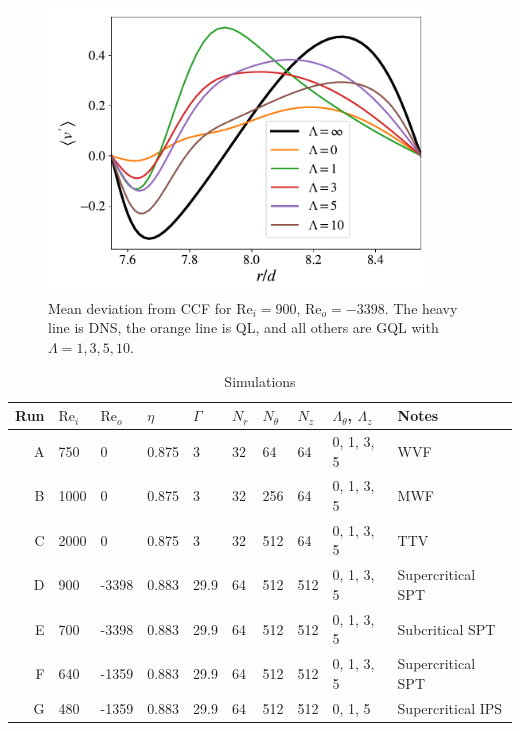 \documentclass[openacc]{rstransa}%
\newcommand{\Reyn}{\mathrm{Re}}
\begin{document}
\begin{figure}
    \centering
    \includegraphics[width=0.9\textwidth]{figs/rei900_reo_-3398_vmean_profile.pdf}
    \caption{Mean deviation from CCF for $\Reyn_i = 900$, $\Reyn_o=-3398$. The heavy line is DNS, the orange line is QL, and all others are GQL with $\Lambda = 1,3,5,10$.}
    \label{fig:rei900_vmean}
\end{figure}

\begin{table}[!h]
\caption{Simulations}
\label{tab:simulations}
\begin{tabular}{rlllllllll}
\hline
Run & $\Reyn_i$ & $\Reyn_o$ & $\eta$ & $\Gamma$  & $N_r$ & $N_\theta$ & $N_z$& $\Lambda_\theta$, $\Lambda_z$ & Notes\\
\hline
A & 750  & 0 & 0.875  & 3 & 32 & 64 & 64 & 0, 1, 3, 5 & WVF\\
B & 1000 & 0 & 0.875 & 3 & 32 & 256 & 64 & 0, 1, 3, 5 & MWF\\
C & 2000 & 0 & 0.875 & 3 & 32 & 512 & 64 & 0, 1, 3, 5 & TTV\\
\hline
D & 900 & -3398 & 0.883 & 29.9 & 64 & 512 & 512 & 0, 1, 3, 5 & Supercritical SPT\\
E & 700 & -3398 & 0.883 & 29.9 & 64 & 512 & 512 & 0, 1, 3, 5 & Subcritical SPT\\
\hline
F & 640 & -1359 & 0.883 & 29.9 & 64 & 512 & 512 & 0, 1, 3, 5 & Supercritical SPT\\
G & 480 & -1359 & 0.883 & 29.9 & 64 & 512 & 512 & 0, 1, 5 & Supercritical IPS\\
\end{tabular}
\vspace*{-4pt}
\end{table}%
\end{document}

